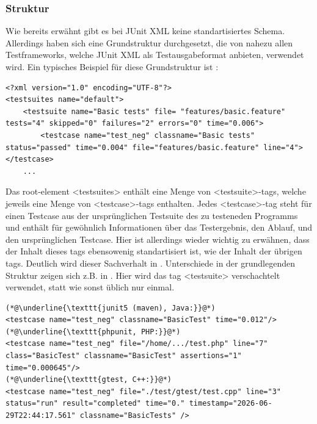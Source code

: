 \subsubsection{Struktur}
Wie bereits erwähnt gibt es bei JUnit XML keine standartisiertes Schema. Allerdings haben sich eine Grundstruktur durchgesetzt, die von nahezu allen Testframeworks, welche JUnit XML als Testausgabeformat anbieten, verwendet wird. Ein typisches Beispiel für diese Grundstruktur ist :
\begin{lstlisting}[caption={JUnit XML, erzeugt durch das PHP-Testframework behat.\\ \textellipsis{} bezeichnet gekürzte Stellen.}, label={JUNITbehat}]
<?xml version="1.0" encoding="UTF-8"?>
<testsuites name="default">
    <testsuite name="Basic tests" file= "features/basic.feature" tests="4" skipped="0" failures="2" errors="0" time="0.006">
        <testcase name="test_neg" classname="Basic tests" status="passed" time="0.004" file="features/basic.feature" line="4"></testcase>
    ...
\end{lstlisting}
Das root-element <testsuites> enthält eine Menge von <testsuite>-tags, welche jeweils eine Menge von <testcase>-tags enthalten. Jedes <testcase>-tag steht für einen Testcase aus der ursprünglichen Testsuite des zu testeneden Programms und enthält für gewöhnlich Informationen über das Testergebnis, den Ablauf, und den ursprünglichen Testcase. Hier ist allerdings wieder wichtig zu erwähnen, dass der Inhalt dieses tags ebensowenig standartisiert ist, wie der Inhalt der übrigen tags. Deutlich wird dieser Sachverhalt in . Unterschiede in der grundlegenden Struktur zeigen sich z.B. in . Hier wird das tag <testsuite> verschachtelt verwendet, statt wie sonst üblich nur einmal.

\begin{lstlisting}[caption={direkter Vergleich verschiedener Implementierungen des <testcase>-tags in ausgewählten JUnit-XML Ausgaben. Verglichen wird jeweils die Ausgabe des fehlerlosen, nicht übersprungenen Testcases test\_neg.\\ \textellipsis{} bezeichnet gekürzte Stellen.}, label={JUNITcompare}]
(*@\underline{\texttt{junit5 (maven), Java:}}@*)
<testcase name="test_neg" classname="BasicTest" time="0.012"/>
(*@\underline{\texttt{phpunit, PHP:}}@*)
<testcase name="test_neg" file="/home/.../test.php" line="7" class="BasicTest" classname="BasicTest" assertions="1" time="0.000645"/>
(*@\underline{\texttt{gtest, C++:}}@*)
<testcase name="test_neg" file="./test/gtest/test.cpp" line="3" status="run" result="completed" time="0." timestamp="2026-06-29T22:44:17.561" classname="BasicTests" />
\end{lstlisting}

